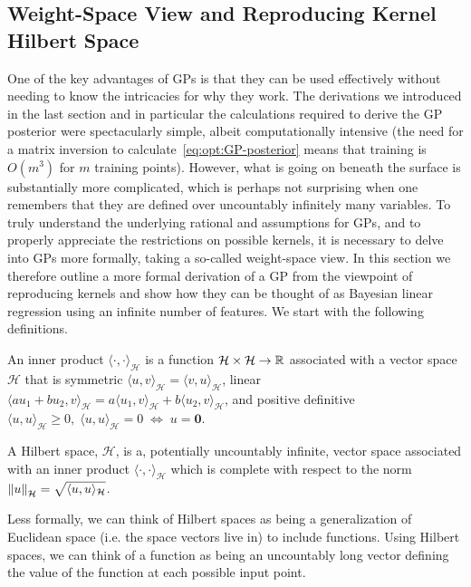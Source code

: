 \subsection{Weight-Space View and Reproducing Kernel Hilbert Space}
\label{sec:opt:gps:weight}

One of the key advantages of GPs is that they can be used effectively without needing
to know the intricacies for why they work.  The derivations we introduced in the
last section and in particular the calculations required to derive the GP posterior were
spectacularly simple, albeit computationally intensive (the need for a matrix inversion
to calculate~\eqref{eq:opt:GP-posterior} means that training is $O(m^3)$ for
$m$ training points).  However, what is going on beneath the surface is substantially
more complicated, which is perhaps not surprising when one remembers that they
are defined over uncountably infinitely many variables.  
To truly understand the underlying rational and assumptions for GPs, and to properly
appreciate the restrictions on possible kernels, it is necessary to delve into GPs more
formally, taking a so-called weight-space view.
In this section we therefore outline a more formal derivation of a GP
from the viewpoint of reproducing kernels \citep{hofmann2008kernel}
and show how they can be thought of as Bayesian linear regression
using an infinite number of features.
We start with the following definitions.

\begin{definition}{}
	An inner product $\langle\cdot,\cdot\rangle_{\mathcal{H}}$ is a function $\mathcal{H} \times \mathcal{H} \rightarrow \mathbb{R}$ 
	associated with a vector space $\mathcal{H}$
	that is symmetric $\langle u,v\rangle_{\mathcal{H}}=\langle v,u\rangle_{\mathcal{H}}$, linear $\langle a u_1 + b u_2,v\rangle_{\mathcal{H}} = a \langle u_1,v\rangle_{\mathcal{H}} +b\langle u_2,v\rangle_{\mathcal{H}}$, and positive definitive $\langle u,u\rangle_{\mathcal{H}} \ge 0, \; \langle u,u\rangle_{\mathcal{H}} = 0 \; \Leftrightarrow \; u=\mathbf{0}$.
	\label{opt:def:InnerProduce}
\end{definition}
\begin{definition}{}
	A Hilbert space, $\mathcal{H}$, is a, potentially uncountably infinite, vector space associated with an inner product
	$\langle\cdot,\cdot\rangle_{\mathcal{H}}$ 
	which is complete with respect to the norm $\left\lVert u\right\rVert_{\mathcal{H}} = \sqrt{\langle u,u\rangle_{\mathcal{H}}}$.
	\label{opt:def:HilbertSpace}
\end{definition}
\noindent Less formally, we can think of Hilbert spaces as being a generalization of Euclidean space (i.e. the space vectors live in)
to include functions.  Using Hilbert spaces, we can think of a function as being an uncountably long vector defining
the value of the function at each possible input point.

